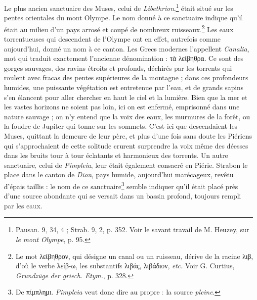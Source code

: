 \documentclass[a4paper, 11pt, oneside, polutonikogreek, french]{article}
\begin{document}
Le plus ancien sanctuaire des Muses, celui de \emph{Libethrion},\footnote{Pausan. 9, 34, 4 ; Strab. 9, 2, p. 352. Voir le savant travail de M. Heuzey, sur \emph{le mont Olympe}, p. 95.} était situé sur les pentes orientales du mont Olympe. Le nom donné à ce sanctuaire indique qu'il était au milieu d'un pays arrosé et coupé de nombreux ruisseaux.\footnote{Le mot λείβηθρον, qui désigne un canal ou un ruisseau, dérive de la racine λιβ, d'où le verbe λείβ-ω, les substantifs λιβάς, λιβάδιον, \emph{etc.} Voir G. Curtius, \emph{Grundzüge der griech. Etym.}, p. 328.} Les eaux torrentueuses qui descendent de l'Olympe ont en effet, autrefois comme aujourd'hui, donné un nom à ce canton. Les Grecs modernes l'appellent \emph{Canalia}, mot qui traduit exactement l'ancienne dénomination : τὰ λείβηθρα. Ce sont des gorges sauvages, des ravins étroits et profonds, déchirés par les torrents qui roulent avec fracas des pentes supérieures de la montagne ; dans ces profondeurs humides, une puissante végétation est entretenue par l'eau, et de grands sapins s'en élancent pour aller chercher en haut le ciel et la lumière. Bien que la mer et les vastes horizons ne soient pas loin, ici on est enfermé, emprisonné dans une nature sauvage ; on n'y entend que la voix des eaux, les murmures de la forêt, ou la foudre de Jupiter qui tonne sur les sommets. C'est ici que descendaient les Muses, quittant la demeure de leur père, et plus d'une fois sans doute les Piériens qui s'approchaient de cette solitude crurent surprendre la voix même des déesses dans les bruits tour à tour éclatants et harmonieux des torrents. Un autre sanctuaire, celui de \emph{Pimpleia}, leur était également consacré en Piérie. Strabon le place dans le canton de \emph{Dion}, pays humide, aujourd'hui marécageux, revêtu d'épais taillis : le nom de ce sanctuaire\footnote{De πίμπλημι. \emph{Pimpleia} veut donc dire au propre : la source \emph{pleine}.} semble indiquer qu'il était placé près d'une source abondante qui se versait dans un bassin profond, toujours rempli par les eaux.
\end{document}
